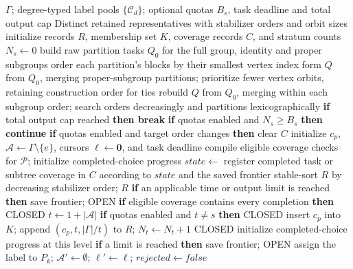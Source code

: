 \documentclass[a5paper, 10pt]{article}
\begin{document}
\begin{algorithm}[H]
\caption{Subgroup-Lattice Descent}
\label{alg:enum}
\scriptsize
\setlength{\baselineskip}{7.1pt}
\begin{algorithmic}[1]
\Require $\Gamma$; degree-typed label pools $\{\mathcal C_d\}$; optional quotas $B_s$, task deadline and total output cap
\Ensure Distinct retained representatives with stabilizer orders and orbit sizes
\State initialize records $R$, membership set $K$, coverage records $C$, and stratum counts $N_s\gets0$
\State build raw partition tasks $Q_0$ for the full group, identity and proper subgroups
\State order each partition's blocks by their smallest vertex index
\State form $Q$ from $Q_0$, merging proper-subgroup partitions; prioritize fewer vertex orbits, retaining construction order for ties
  \State rebuild $Q$ from $Q_0$, merging within each subgroup order; search orders decreasingly and partitions lexicographically
\EndIf
{}
  \State \textbf{if} total output cap reached \textbf{then break}
  \State \textbf{if} quotas enabled and $N_s\ge B_s$ \textbf{then continue}
  \State \textbf{if} quotas enabled and target order changes \textbf{then} clear $C$
  \State initialize $c_p$, $\mathcal A\gets\Gamma\setminus\{e\}$, cursors $\boldsymbol\ell\gets\mathbf0$, and task deadline
  \State compile eligible coverage checks for $\mathcal P$; initialize completed-choice progress
  \State $state\gets$ 
  \State register completed task or subtree coverage in $C$ according to $state$ and the saved frontier
\EndFor
\State stable-sort $R$ by decreasing stabilizer order; \Return $R$
\Statex
{}
  \State \textbf{if} an applicable time or output limit is reached \textbf{then} save frontier; \Return OPEN
  \State \textbf{if} eligible coverage contains every completion \textbf{then} \Return CLOSED
    \State $t\gets1+|\mathcal A|$
    \State \textbf{if} quotas enabled and $t\ne s$ \textbf{then} \Return CLOSED
      \State insert $c_p$ into $K$; append $(c_p,t,|\Gamma|/t)$ to $R$; $N_t\gets N_t+1$
    \EndIf
    \State \Return CLOSED
  \EndIf
  \State initialize completed-choice progress at this level
    \State \textbf{if} a limit is reached \textbf{then} save frontier; \Return OPEN
    \State assign the label to $P_k$; $\mathcal A'\gets\emptyset$; $\boldsymbol\ell'\gets\boldsymbol\ell$; $rejected\gets false$

\end{algorithmic}
\end{algorithm}
\end{document}
